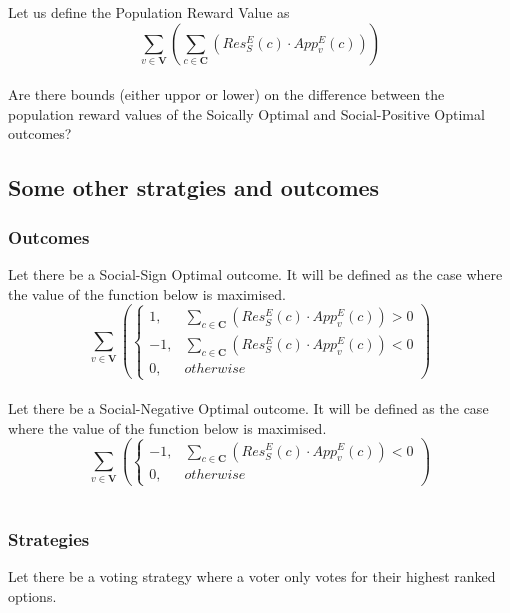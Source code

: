 \documentclass{article}
\begin{document}
Let us define the Population Reward Value as
\begin{equation}
\sum^{}_{v \in \pmb{V}}{\left(
\sum^{}_{c \in \pmb{C}}{\left(
Res^{E}_{S}(c) \cdot App^{E}_{v}(c)
\right)}
\right)}
\end{equation}\\

Are there bounds (either uppor or lower) on the difference between the population reward values of the Soically Optimal and Social-Positive Optimal outcomes?


\subsection{Some other stratgies and outcomes}

\subsubsection{Outcomes}

Let there be a Social-Sign Optimal outcome. It will be defined as the case where the value of the function below is maximised.
\begin{equation}
\sum^{}_{v \in \pmb{V}}{\left(
\begin{cases}
1, & \sum^{}_{c \in \pmb{C}}{(Res^{E}_{S}(c) \cdot App^{E}_{v}(c))} > 0\\
-1, & \sum^{}_{c \in \pmb{C}}{(Res^{E}_{S}(c) \cdot App^{E}_{v}(c))} < 0\\
0, & {otherwise}
\end{cases}
\right)}
\end{equation}\\

Let there be a Social-Negative Optimal outcome. It will be defined as the case where the value of the function below is maximised.
\begin{equation}
\sum^{}_{v \in \pmb{V}}{\left(
\begin{cases}
-1, & \sum^{}_{c \in \pmb{C}}{(Res^{E}_{S}(c) \cdot App^{E}_{v}(c))} < 0\\
0, & {otherwise}
\end{cases}
\right)}
\end{equation}\\

\subsubsection{Strategies}

Let there be a voting strategy where a voter only votes for their highest ranked options.
\end{document}
